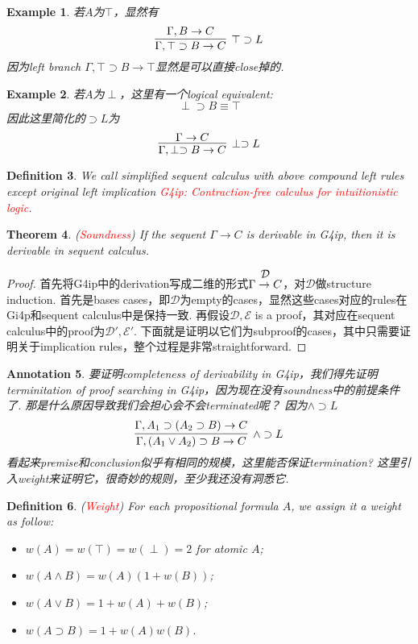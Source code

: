 \documentclass{article}
\theoremstyle{plain}
\newtheorem{theorem}{Theorem}
\newtheorem{example}[theorem]{Example}
\newtheorem{definition}[theorem]{Definition}
\newtheorem{annotation}[theorem]{Annotation}
\newcounter{case}
\theoremstyle{nonumberplain}
\newtheorem{proof}{Proof}
\newcommand{\redt}[1]{\textcolor{red}{#1}}
\begin{document}
\begin{example}
\rm 若$A$为$\top$，显然有
$$
\infer[\top \supset L]{\Gamma, \top \supset B \to C}{\Gamma, B \to C}
$$
因为left branch $\Gamma, \top \supset B \to \top$显然是可以直接close掉的. 
\end{example}

\begin{example}
\rm 若$A$为$\perp$，这里有一个logical equivalent:
$$
\perp \supset B \equiv \top
$$
因此这里简化的$\supset L$为
$$
\infer[\perp \supset L]{\Gamma, \perp \supset  B \to C}{\Gamma \to C}
$$
\end{example}

\begin{definition}
\rm We call simplified sequent calculus with above compound left rules except original left implication \redt{G4ip: Contraction-free calculus for intuitionistic logic}.
\end{definition}

\begin{theorem}
\rm (\redt{Soundness}) If the sequent $\Gamma \to C$ is derivable in G4ip, then it is derivable in sequent calculus.
\end{theorem}

\begin{proof}
\rm  首先将G4ip中的derivation写成二维的形式$\deduce{\Gamma \to C}{\mathcal{D}}$，对$\mathcal{D}$做structure induction. 首先是bases cases，即$\mathcal{D}$为empty的cases，显然这些cases对应的rules在Gi4p和sequent calculus中是保持一致. 再假设$\mathcal{D},\mathcal{E}$ is a proof，其对应在sequent calculus中的proof为$\mathcal{D}',\mathcal{E}'$. 下面就是证明以它们为subproof的cases，其中只需要证明关于implication rules，整个过程是非常straightforward. 
\end{proof}

\begin{annotation}
\rm 要证明completeness of derivability in G4ip，我们得先证明terminitation of proof searching in G4ip，因为现在没有soundness中的前提条件了. 那是什么原因导致我们会担心会不会terminated呢？ 因为$\wedge \supset L$
$$
\infer[\wedge \supset L]{\Gamma, (A_1 \vee A_2) \supset B \to C}{\Gamma, A_1 \supset (A_2 \supset B) \to C}
$$
看起来premise和conclusion似乎有相同的规模，这里能否保证termination? 这里引入weight来证明它，很奇妙的规则，至少我还没有洞悉它. 
\end{annotation}

\begin{definition}
\rm (\redt{Weight}) For each propositional formula $A$, we assign it a weight as follow:
\begin{itemize}
	\item $w(A)=w(\top)=w(\perp) = 2$ for atomic $A$;
	\item $w(A \wedge B) = w(A)(1+w(B))$;
	\item $w(A \vee B) = 1 + w(A) + w(B)$;
	\item $w(A \supset B) = 1 + w(A)w(B)$.
\end{itemize}
\end{definition}
\end{document}
